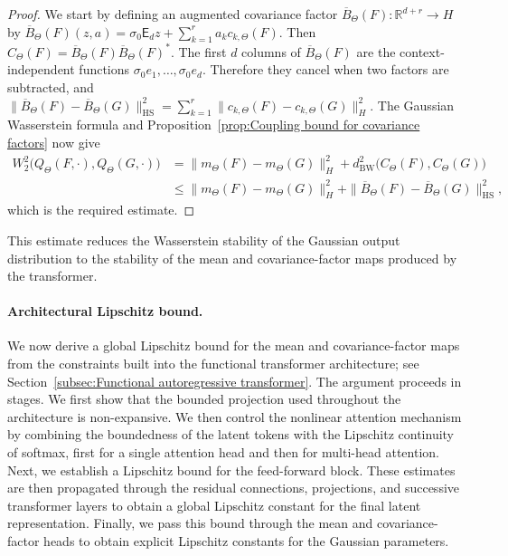 \begin{proof}
We start by defining an augmented covariance factor \(\overline B_\Theta(F):\mathbb R^{d+r}\to H\) by
\(
\overline B_\Theta(F)(z,a)
=\sigma_0\mathsf E_dz+\sum_{k=1}^ra_kc_{k,\Theta}(F).
\)
Then
\(
C_\Theta(F)=\overline B_\Theta(F)\overline B_\Theta(F)^*.
\)
The first \(d\) columns of \(\overline B_\Theta(F)\) are the context-independent functions \(\sigma_0e_1,\ldots,\sigma_0e_d\). Therefore they cancel when two factors are subtracted, and
\(
\|\overline B_\Theta(F)-\overline B_\Theta(G)\|_{\mathrm{HS}}^2
=\sum_{k=1}^r\|c_{k,\Theta}(F)-c_{k,\Theta}(G)\|_H^2.
\)
The Gaussian Wasserstein formula and Proposition~\ref{prop:Coupling bound for covariance factors} now give
\[
\begin{aligned}
W_2^2\bigl(Q_\Theta(F,\cdot),Q_\Theta(G,\cdot)\bigr)
&=\|m_\Theta(F)-m_\Theta(G)\|_H^2
+d_{\mathrm{BW}}^2\bigl(C_\Theta(F),C_\Theta(G)\bigr)\\
&\leqslant\|m_\Theta(F)-m_\Theta(G)\|_H^2
+\|\overline B_\Theta(F)-\overline B_\Theta(G)\|_{\mathrm{HS}}^2,
\end{aligned}
\]
which is the required estimate.
\end{proof}



This estimate reduces the Wasserstein stability of the Gaussian output distribution to the stability of the mean and covariance-factor maps produced by the transformer.

\paragraph{Architectural Lipschitz bound.}

We now derive a global Lipschitz bound for the mean and covariance-factor maps from the constraints built into the functional transformer architecture; see Section~\ref{subsec:Functional autoregressive transformer}. The argument proceeds in stages. We first show that the bounded projection used throughout the architecture is non-expansive. We then control the nonlinear attention mechanism by combining the boundedness of the latent tokens with the Lipschitz continuity of softmax, first for a single attention head and then for multi-head attention. Next, we establish a Lipschitz bound for the feed-forward block. These estimates are then propagated through the residual connections, projections, and successive transformer layers to obtain a global Lipschitz constant for the final latent representation. Finally, we pass this bound through the mean and covariance-factor heads to obtain explicit Lipschitz constants for the Gaussian parameters.

